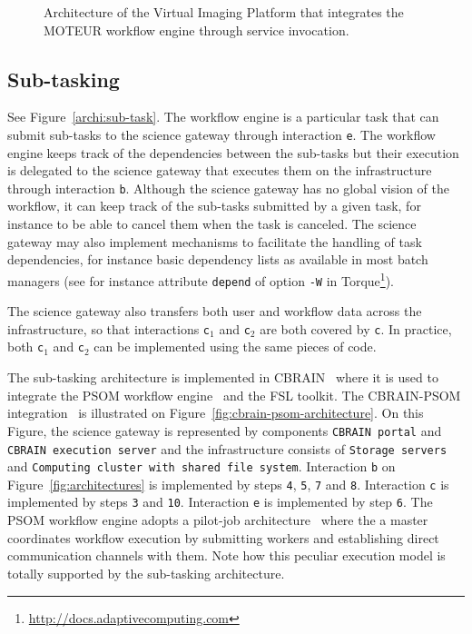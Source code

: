 \documentclass[preprint,3p,twocolumn]{elsarticle}
\begin{document}
\begin{figure}
\centering
\def\svgwidth{1.5\columnwidth}

\caption{Architecture of the Virtual Imaging Platform that integrates
  the MOTEUR workflow engine through service invocation.}
\label{fig:vip-architecture}
\end{figure}

\subsection{Sub-tasking}

See Figure~\ref{archi:sub-task}. The workflow engine is a particular
task that can submit sub-tasks to the science gateway through
interaction \texttt{e}. The workflow engine keeps track of the
dependencies between the sub-tasks but their execution is delegated to
the science gateway that executes them on the infrastructure through
interaction \texttt{b}. Although the science gateway has no global
vision of the workflow, it can keep track of the sub-tasks submitted
by a given task, for instance to be able to cancel them when the task
is canceled. The science gateway may also implement mechanisms to
facilitate the handling of task dependencies, for instance basic
dependency lists as available in most batch managers (see for instance
attribute \texttt{depend} of option \texttt{-W} in
Torque\footnote{\url{http://docs.adaptivecomputing.com}}).

The science gateway also transfers both user and workflow data across
the infrastructure, so that interactions \texttt{c$_1$} and
\texttt{c$_2$} are both covered by \texttt{c}. In practice, both
\texttt{c$_1$} and \texttt{c$_2$} can be implemented using the same
pieces of code.

The sub-tasking architecture is implemented in CBRAIN~\cite{SHER-14}
where it is used to integrate the PSOM workflow
engine~\cite{bellec2012pipeline} and the FSL toolkit. The CBRAIN-PSOM
integration~\cite{GLAT-16} is illustrated on
Figure~\ref{fig:cbrain-psom-architecture}. On this Figure, the science
gateway is represented by components \texttt{CBRAIN portal} and
\texttt{CBRAIN execution server} and the infrastructure consists of
\texttt{Storage servers} and \texttt{Computing cluster with shared
  file system}. Interaction \texttt{b} on
Figure~\ref{fig:architectures} is implemented by steps \texttt{4},
\texttt{5}, \texttt{7} and \texttt{8}. Interaction \texttt{c} is
implemented by steps \texttt{3} and \texttt{10}. Interaction
\texttt{e} is implemented by step \texttt{6}. The PSOM workflow engine
adopts a pilot-job architecture~\cite{turilli2015comprehensive} where
the a master coordinates workflow execution by submitting workers
and establishing direct communication channels with them. Note how
this peculiar execution model is totally supported by the sub-tasking
architecture.
\end{document}

